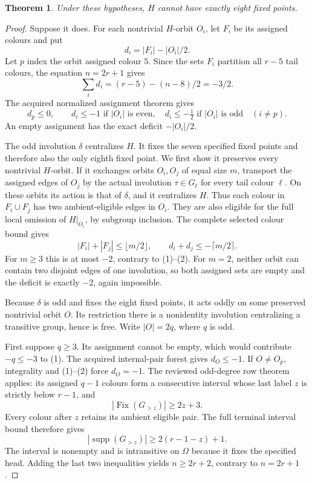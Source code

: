 \documentclass[11pt,a4paper]{article}
\newtheorem{theorem}{Theorem}
\begin{document}
\begin{theorem}
Under these hypotheses, $H$ cannot have exactly eight
fixed points.
\end{theorem}
\begin{proof}
Suppose it does. For each nontrivial $H$-orbit $O_i$,
let $F_i$ be its assigned colours and put
\[
 d_i=|F_i|-|O_i|/2.
\]
Let $p$ index the orbit assigned colour $5$. Since the
sets $F_i$ partition all $r-5$ tail colours, the equation
$n=2r+1$ gives
\[
                    \sum_i d_i=(r-5)-(n-8)/2=-3/2.       \tag{1}
\]
The acquired normalized assignment theorem gives
\[
 d_p\le0,\qquad
 d_i\le-1\text{ if }|O_i|\text{ is even},\quad
 d_i\le-\tfrac12\text{ if }|O_i|\text{ is odd}
 \quad(i\ne p).                                        \tag{2}
\]
An empty assignment has the exact deficit $-|O_i|/2$.

The odd involution $\delta$ centralizes $H$. It fixes
the seven specified fixed points and therefore also the
only eighth fixed point. We first show it preserves every
nontrivial $H$-orbit. If it exchanges orbits $O_i,O_j$
of equal size $m$, transport the assigned edges of $O_j$
by the actual involution $\tau\in G_\ell$ for every
tail colour $\ell$. On these orbits its action is that
of $\delta$, and it centralizes $H$. Thus each colour in
$F_i\cup F_j$ has two ambient-eligible edges in $O_i$.
They are also eligible for the full local omission of
$H|_{O_i}$, by subgroup inclusion. The complete selected
colour bound gives
\[
 |F_i|+|F_j|\le\lfloor m/2\rfloor,
 \qquad d_i+d_j\le-\lceil m/2\rceil.
\]
For $m\ge3$ this is at most $-2$, contrary to (1)--(2).
For $m=2$, neither orbit can contain two disjoint edges
of one involution, so both assigned sets are empty and
the deficit is exactly $-2$, again impossible.

Because $\delta$ is odd and fixes the eight fixed points,
it acts oddly on some preserved nontrivial orbit $O$.
Its restriction there is a nonidentity involution
centralizing a transitive group, hence is free.
Write $|O|=2q$, where $q$ is odd.

First suppose $q\ge3$. Its assignment cannot be empty,
which would contribute $-q\le-3$ to (1). The acquired
internal-pair forest gives $d_O\le-1$. If $O\ne O_p$,
integrality and (1)--(2) force $d_O=-1$.
The reviewed odd-degree row theorem applies: its assigned
$q-1$ colours form a consecutive interval whose last
label $z$ is strictly below $r-1$, and
\[
                  |\operatorname{Fix}(G_{>z})|\ge2z+3.
\]
Every colour after $z$ retains its ambient eligible pair.
The full terminal interval bound therefore gives
\[
 |\operatorname{supp}(G_{>z})|
                  \ge2(r-1-z)+1.
\]
The interval is nonempty and is intransitive on $\Omega$
because it fixes the specified head. Adding the last
two inequalities yields $n\ge2r+2$, contrary to $n=2r+1$.


\end{proof}
\end{document}
